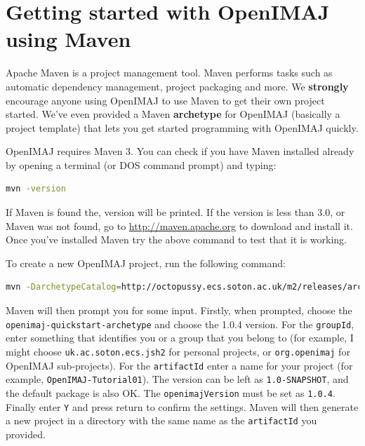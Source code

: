 \documentclass[10pt,a4paper,twoside,extrafontsizes]{memoir}
\begin{document}
\chapter{Getting started with OpenIMAJ using Maven}
\pagestyle{headings}
Apache Maven is a project management tool.  Maven performs tasks such 
as automatic  dependency management, project packaging and more. We \textbf{strongly} 
encourage anyone using OpenIMAJ to use Maven to get their own project started. 
We've even provided a Maven \textbf{archetype} for OpenIMAJ (basically a project template) 
that lets you get started programming with OpenIMAJ quickly. 

OpenIMAJ requires Maven 3. You can check if you have Maven installed already 
by opening a terminal (or DOS command prompt) and typing:
\begin{lstlisting}[language=bash]
mvn -version
\end{lstlisting}
If Maven is found the, version will be printed. If the version is less than 3.0, 
or Maven was not found, go to \url{http://maven.apache.org} to download and 
install it. Once you've installed Maven try the above command to test that it 
is working.

To create a new OpenIMAJ project, run the following command:
\begin{lstlisting}[language=bash]
mvn -DarchetypeCatalog=http://octopussy.ecs.soton.ac.uk/m2/releases/archetype-catalog.xml archetype:generate
\end{lstlisting}

Maven will then prompt you for some input.  Firstly, when prompted, choose 
the \texttt{openimaj-quickstart-archetype} and choose the 1.0.4 version. For the \verb+groupId+, 
enter something that identifies you or a group that you belong to (for example, I might choose 
\verb+uk.ac.soton.ecs.jsh2+ for personal projects, or \verb+org.openimaj+ for OpenIMAJ sub-projects). 
For the \verb+artifactId+ enter a name for your project (for example, \verb+OpenIMAJ-Tutorial01+). The 
version can be left as \verb+1.0-SNAPSHOT+, and the default package is also OK. The 
\verb+openimajVersion+ must be set as \verb+1.0.4+. Finally enter \verb+Y+ and press return
to confirm the settings. Maven will then generate a new project in a directory with the same 
name as the \verb+artifactId+ you provided.
\end{document}
